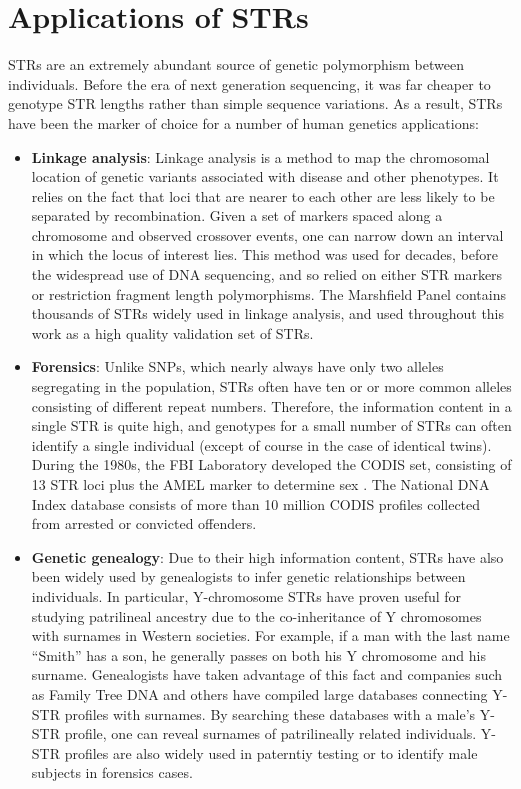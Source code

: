 \section{Applications of STRs}
STRs are an extremely abundant source of genetic polymorphism between individuals. Before the era of next generation sequencing, it was far cheaper to genotype STR lengths rather than simple sequence variations. As a result, STRs have been the marker of choice for a number of human genetics applications:
\begin{itemize}
\item \textbf{Linkage analysis}: Linkage analysis is a method to map the chromosomal location of genetic variants associated with disease and other phenotypes. It relies on the fact that loci that are nearer to each other are less likely to be separated by recombination. Given a set of markers spaced along a chromosome and observed crossover events, one can narrow down an interval in which the locus of interest lies. This method was used for decades, before the widespread use of DNA sequencing, and so relied on either STR markers or restriction fragment length polymorphisms. The Marshfield Panel \cite{BromanMurraySheffieldEtAl1998} contains thousands of STRs widely used in linkage analysis, and used throughout this work as a high quality validation set of STRs. 
\item \textbf{Forensics}: Unlike SNPs, which nearly always have only two alleles segregating in the population, STRs often have ten or or more common alleles consisting of different repeat numbers. Therefore, the information content in a single STR is quite high, and genotypes for a small number of STRs can often identify a single individual (except of course in the case of identical twins). During the 1980s, the FBI Laboratory developed the CODIS set, consisting of 13 STR loci plus the AMEL marker to determine sex \cite{BudowleSheaNiezgodaEtAl2001}. The National DNA Index database consists of more than 10 million CODIS profiles collected from arrested or convicted offenders. 
\item \textbf{Genetic genealogy}: Due to their high information content, STRs have also been widely used by genealogists to infer genetic relationships between individuals. In particular, Y-chromosome STRs have proven useful for studying patrilineal ancestry due to the co-inheritance of Y chromosomes with surnames in Western societies. For example, if a man with the last name ``Smith'' has a son, he generally passes on both his Y chromosome and his surname. Genealogists have taken advantage of this fact and companies such as Family Tree DNA and others have compiled large databases connecting Y-STR profiles with surnames. By searching these databases with a male's Y-STR profile, one can reveal surnames of patrilineally related individuals. Y-STR profiles are also widely used in paterntiy testing or to identify male subjects in forensics cases.
\end{itemize}

